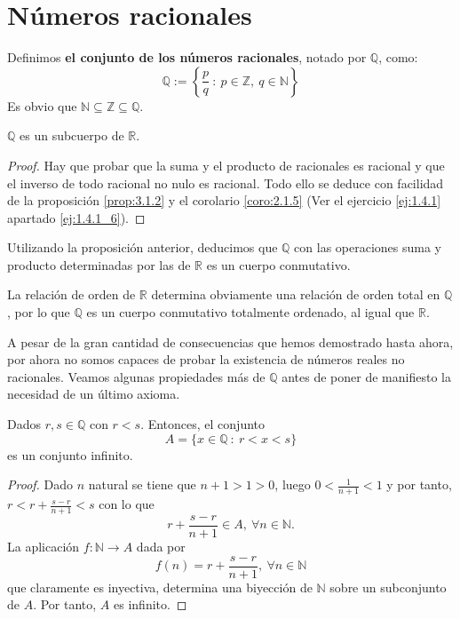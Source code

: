 \section{Números racionales}
\begin{definicion}
    Definimos \textbf{el conjunto de los números racionales}, notado por $\mathbb{Q}$, como:
    \begin{equation*}
        \mathbb{Q} := \left\{ \frac{p}{q}~:~p \in \mathbb{Z},~q \in \mathbb{N} \right\}
    \end{equation*}
    Es obvio que $\mathbb{N} \subseteq \mathbb{Z} \subseteq \mathbb{Q}$.
\end{definicion}

\begin{prop}
    $\mathbb{Q}$ es un subcuerpo de $\mathbb{R}$.
\end{prop}
\begin{proof}
    Hay que probar que la suma y el producto de racionales es racional y que el inverso de todo racional no nulo es racional. Todo ello se deduce con facilidad de la proposición \ref{prop:3.1.2} y el corolario \ref{coro:2.1.5} (Ver el ejercicio \ref{ej:1.4.1} apartado \ref{ej:1.4.1_6}).
\end{proof}

Utilizando la proposición anterior, deducimos que $\mathbb{Q}$ con las operaciones suma y producto determinadas por las de $\mathbb{R}$ es un cuerpo conmutativo.

La relación de orden de $\mathbb{R}$ determina obviamente una relación de orden total en $\mathbb{Q}$, por lo que $\mathbb{Q}$ es un cuerpo conmutativo totalmente ordenado, al igual que $\mathbb{R}$. 

A pesar de la gran cantidad de consecuencias que hemos demostrado hasta ahora, por ahora no somos capaces de probar la existencia de números reales no racionales. Veamos algunas propiedades más de $\mathbb{Q}$ antes de poner de manifiesto la necesidad de un último axioma.
\begin{prop}
    Dados $r,s \in \mathbb{Q}$ con $r < s$. Entonces, el conjunto
    \begin{equation*}
        A=\{x \in \mathbb{Q}~:~r < x < s\}
    \end{equation*}
    es un conjunto infinito.
\end{prop}
\begin{proof}
    Dado $n$ natural se tiene que $n+1 > 1 > 0$, luego $0 < \frac{1}{n+1} < 1$ y por tanto,
    $r < r + \frac{s-r}{n+1} < s$ con lo que
    \begin{equation*}
        r + \frac{s-r}{n+1} \in A,~\forall n \in \mathbb{N}.
    \end{equation*}
    La aplicación $f:\mathbb{N} \longrightarrow A$ dada por
    \begin{equation*}
        f(n) = r + \frac{s-r}{n+1},~\forall n \in \mathbb{N}
    \end{equation*}
    que claramente es inyectiva, determina una biyección de $\mathbb{N}$ sobre un subconjunto de $A$. Por tanto,
    $A$ es infinito.    
\end{proof}

